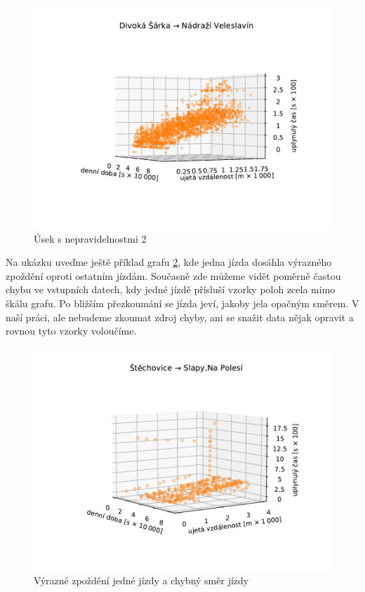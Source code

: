 \begin{figure}
\centering
  \includegraphics[width=\linewidth]{../img/164_165}
  \caption{Úsek s nepravidelnostmi 2}
  \label{fig:divoka_sarka_veleslavin}
\end{figure}

\bigbreak


Na ukázku uveďme ještě příklad grafu \ref{fig:delayed_trip}, kde jedna jízda dosáhla výrazného zpoždění oproti ostatním jízdám. Současně zde můžeme vidět poměrně častou chybu ve vstupních datech, kdy jedné jízdě přísluší vzorky poloh zcela mimo škálu grafu. Po bližším přezkoumání se jízda jeví, jakoby jela opačným směrem. V naší práci, ale nebudeme zkoumat zdroj chyby, ani se snažit data nějak opravit a rovnou tyto vzorky voloučíme.


\begin{figure}
\centering
  \includegraphics[width=\linewidth]{../img/16_17}
  \caption{Výrazné zpoždění jedné jízdy a chybný směr jízdy}
  \label{fig:delayed_trip}
\end{figure}


